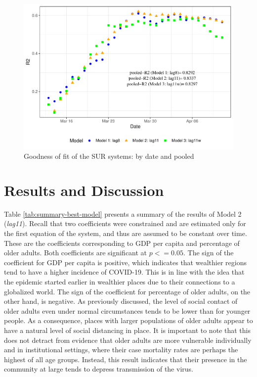 \documentclass[]{elsarticle} %
\makeatletter
\def\maxwidth{\ifdim\Gin@nat@width>\linewidth\linewidth
\else\Gin@nat@width\fi}
\let\Oldincludegraphics\includegraphics
\renewcommand{\includegraphics}[1]{\Oldincludegraphics[width=\maxwidth]{#1}}
\makeatother
\begin{document}
\begin{figure}
\centering
\includegraphics{Environmental-Correlates-of-COVID19-Spain_files/figure-latex/goodness-of-fit-1.pdf}
\caption{\label{fig:goodness-of-fit} Goodness of fit of the SUR systems:
by date and pooled}
\end{figure}

\hypertarget{results-and-discussion}{%
\section{Results and Discussion}\label{results-and-discussion}}

Table \ref{tab:summary-best-model} presents a summary of the results of
Model 2 (\emph{lag11}). Recall that two coefficients were constrained
and are estimated only for the first equation of the system, and thus
are assumed to be constant over time. These are the coefficients
corresponding to GDP per capita and percentage of older adults. Both
coefficients are significant at \(p<=0.05\). The sign of the coefficient
for GDP per capita is positive, which indicates that wealthier regions
tend to have a higher incidence of COVID-19. This is in line with the
idea that the epidemic started earlier in wealthier places due to their
connections to a globalized world. The sign of the coefficient for
percentage of older adults, on the other hand, is negative. As
previously discussed, the level of social contact of older adults even
under normal circumstances tends to be lower than for younger people. As
a consequence, places with larger populations of older adults appear to
have a natural level of social distancing in place. It is important to
note that this does not detract from evidence that older adults are more
vulnerable individually and in institutional settings, where their case
mortality rates are perhaps the highest of all age groups. Instead, this
result indicates that their presence in the community at large tends to
depress transmission of the virus.
\end{document}
